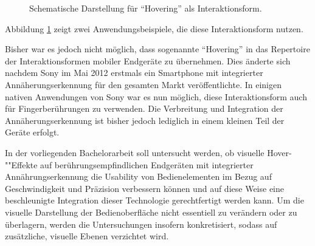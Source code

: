 \documentclass[a4paper,12pt,bibliography=totoc]{scrreprt}%
\begin{document}
\begin{figure}
\centering
{}
\hfill
{}
\caption{Schematische Darstellung für "`Hovering"' als Interaktionsform.}
\label{hoveringdesktop}
\end{figure}
Abbildung \ref{hoveringdesktop} zeigt zwei Anwendungsbeispiele, die diese Interaktionsform nutzen.

Bisher war es jedoch nicht möglich, dass sogenannte "`Hovering"' in das Repertoire der Interaktionsformen mobiler Endgeräte zu übernehmen. Dies änderte sich nachdem Sony im Mai 2012 erstmals ein Smartphone mit integrierter Annäherungserkennung für den gesamten Markt veröffentlichte. In einigen nativen Anwendungen von Sony war es nun möglich, diese Interaktionsform auch für Fingerberührungen zu verwenden.\cite{sonyverge} Die Verbreitung und Integration der Annäherungserkennung ist bisher jedoch lediglich in einem kleinen Teil der Geräte erfolgt.

In der vorliegenden Bachelorarbeit soll untersucht werden, ob visuelle Hover-""Effekte auf berührungsempfindlichen Endgeräten mit integrierter Annährungserkennung die Usability von Bedienelementen im Bezug auf Geschwindigkeit und Präzision verbessern können und auf diese Weise eine beschleunigte Integration dieser Technologie gerechtfertigt werden kann. Um die visuelle Darstellung der Bedienoberfläche nicht essentiell zu verändern oder zu überlagern, werden die Untersuchungen insofern konkretisiert, sodass auf zusätzliche, visuelle Ebenen verzichtet wird.
\end{document}
